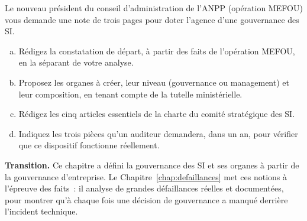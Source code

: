 \begin{boxexo}[title={\ding{45}\quad Exercice~1.3. Doter l'ANPP d'une gouvernance des SI \niveauexpert}]
Le nouveau président du conseil d'administration de l'ANPP (opération
MEFOU) vous demande une note de trois pages pour doter l'agence d'une
gouvernance des SI.
\begin{enumerate}[(a)]
    \item Rédigez la constatation de départ, à partir des faits de
          l'opération MEFOU, en la séparant de votre analyse.
    \item Proposez les organes à créer, leur niveau (gouvernance ou
          management) et leur composition, en tenant compte de la tutelle
          ministérielle.
    \item Rédigez les cinq articles essentiels de la charte du comité
          stratégique des SI.
    \item Indiquez les trois pièces qu'un auditeur demandera, dans un an,
          pour vérifier que ce dispositif fonctionne réellement.
\end{enumerate}
\end{boxexo}

\bigskip

\begin{boxinfo}
\textbf{Transition.} Ce chapitre a défini la gouvernance des SI et ses
organes à partir de la gouvernance d'entreprise. Le
Chapitre~\ref{chap:defaillances} met ces notions à l'épreuve des faits~:
il analyse de grandes défaillances réelles et documentées, pour montrer
qu'à chaque fois une décision de gouvernance a manqué derrière l'incident
technique.
\end{boxinfo}
